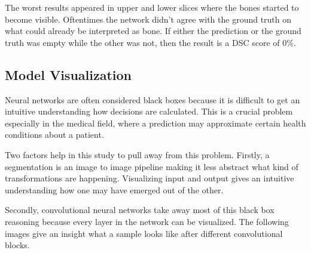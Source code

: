 The worst results appeared in upper and lower slices where the bones started to become visible. Oftentimes the network didn't agree with the ground truth on what could already be interpreted as bone. If either the prediction or the ground truth was empty while the other was not, then the result is a DSC score of 0\%.

\subsection{Model Visualization}

Neural networks are often considered black boxes because it is difficult to get an intuitive understanding how decisions are calculated. This is a crucial problem especially in the medical field, where a prediction may approximate certain health conditions about a patient.

Two factors help in this study to pull away from this problem. Firstly, a segmentation is an image to image pipeline making it less abstract what kind of transformations are happening. Visualizing input and output gives an intuitive understanding how one may have emerged out of the other.

Secondly, convolutional neural networks take away most of this black box reasoning \cite{Chollet2017} because every layer in the network can be visualized. The following images give an insight what a sample looks like after different convolutional blocks.

